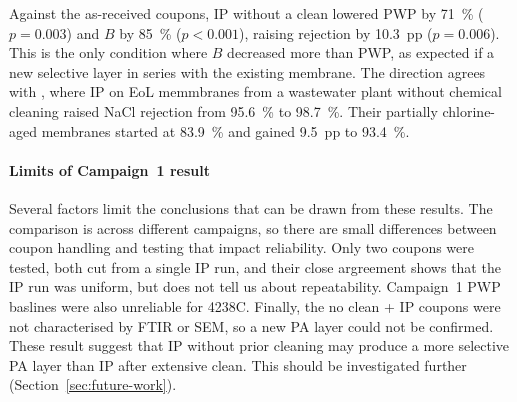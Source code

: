 Against the as-received coupons, IP without a clean lowered PWP by \qty{71}{\percent} ($p = 0.003$) and $B$ by \qty{85}{\percent} ($p < 0.001$), raising rejection by \qty{10.3}{pp} ($p = 0.006$). This is the only condition where $B$ decreased more than PWP, as expected if a new selective layer in series with the existing membrane. The direction agrees with \citet{Ogbe2026}, where IP on EoL memmbranes from a wastewater plant without chemical cleaning raised NaCl rejection from \qty{95.6}{\percent} to \qty{98.7}{\percent}. Their partially chlorine-aged membranes started at \qty{83.9}{\percent} and gained \qty{9.5}{pp} to \qty{93.4}{\percent}.

\paragraph{Limits of Campaign~1 result}
Several factors limit the conclusions that can be drawn from these results. The comparison is across different campaigns, so there are small differences between coupon handling and testing that impact reliability. Only two coupons were tested, both cut from a single IP run, and their close argreement shows that the IP run was uniform, but does not tell us about repeatability. Campaign~1 PWP baslines were also unreliable for 4238C. Finally, the no clean + IP coupons were not characterised by FTIR or SEM, so a new PA layer could not be confirmed. These result suggest that IP without prior cleaning may produce a more selective PA layer than IP after extensive clean. This should be investigated further (Section~\ref{sec:future-work}).



